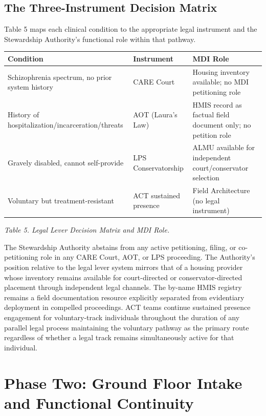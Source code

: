 \documentclass[12pt, letterpaper]{article}
\begin{document}
\subsection{The Three-Instrument Decision Matrix}

Table 5 maps each clinical condition to the appropriate legal instrument and the Stewardship Authority's functional role within that pathway.

{\singlespacing
\begin{tabularx}{\textwidth}{@{}p{4.5cm}Xp{4cm}@{}}
\toprule
\rowcolor{rowgray}
Condition & Instrument & MDI Role \\
\midrule
Schizophrenia spectrum, no prior system history & CARE Court & Housing inventory available; no MDI petitioning role \\
\rowcolor{rowgray}
History of hospitalization/incarceration/threats & AOT (Laura's Law) & HMIS record as factual field document only; no petition role \\
Gravely disabled, cannot self-provide & LPS Conservatorship & ALMU available for independent court/conservator selection \\
\rowcolor{rowgray}
Voluntary but treatment-resistant & ACT sustained presence & Field Architecture (no legal instrument) \\
\bottomrule
\end{tabularx}\par
\vspace{8pt}
\noindent\textit{Table 5. Legal Lever Decision Matrix and MDI Role.}
\par}
The Stewardship Authority abstains from any active petitioning, filing, or co-petitioning role in any CARE Court, AOT, or LPS proceeding. The Authority's position relative to the legal lever system mirrors that of a housing provider whose inventory remains available for court-directed or conservator-directed placement through independent legal channels. The by-name HMIS registry remains a field documentation resource explicitly separated from evidentiary deployment in compelled proceedings. ACT teams continue sustained presence engagement for voluntary-track individuals throughout the duration of any parallel legal process maintaining the voluntary pathway as the primary route regardless of whether a legal track remains simultaneously active for that individual.

\clearpage
\section{Phase Two: Ground Floor Intake and Functional Continuity}
\end{document}
